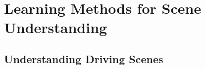 \graphicspath{{./main/4_chapter00/sections/figures/}}

\chapter[Learning Methods for Scene Understanding]{Learning Methods for Scene\\ Understanding}
\label{chap:p2_00}

\section{Understanding Driving Scenes} 
%
%

